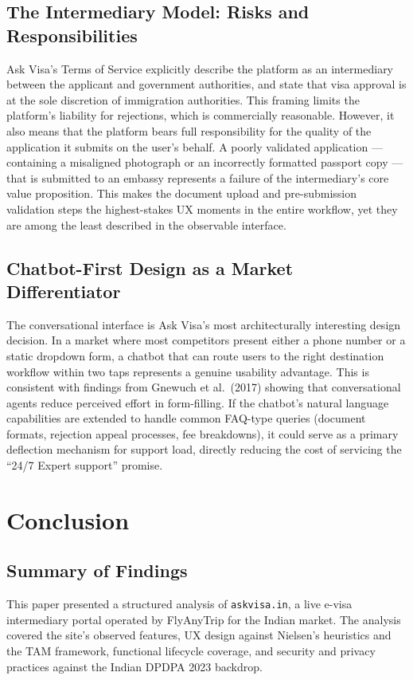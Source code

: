 \documentclass[journal, 10pt, twoside]{IEEEtran}
\begin{document}
\subsection{The Intermediary Model: Risks and Responsibilities}
Ask Visa's Terms of Service explicitly describe the platform as an
intermediary between the applicant and government authorities, and state
that visa approval is at the sole discretion of immigration authorities.
This framing limits the platform's liability for rejections, which is
commercially reasonable. However, it also means that the platform bears
full responsibility for the quality of the application it submits on the
user's behalf. A poorly validated application --- containing a misaligned
photograph or an incorrectly formatted passport copy --- that is submitted
to an embassy represents a failure of the intermediary's core value
proposition. This makes the document upload and pre-submission validation
steps the highest-stakes UX moments in the entire workflow, yet they
are among the least described in the observable interface.

\subsection{Chatbot-First Design as a Market Differentiator}
The conversational interface is Ask Visa's most architecturally interesting
design decision. In a market where most competitors present either a phone
number or a static dropdown form, a chatbot that can route users to the
right destination workflow within two taps represents a genuine usability
advantage. This is consistent with findings from Gnewuch et al.\ (2017)
showing that conversational agents reduce perceived effort in form-filling.
If the chatbot's natural language capabilities are extended to handle common
FAQ-type queries (document formats, rejection appeal processes, fee
breakdowns), it could serve as a primary deflection mechanism for support
load, directly reducing the cost of servicing the ``24/7 Expert support''
promise.

\section{Conclusion}
\label{sec:conclusion}

\subsection{Summary of Findings}
This paper presented a structured analysis of \texttt{askvisa.in}, a live
e-visa intermediary portal operated by FlyAnyTrip for the Indian market.
The analysis covered the site's observed features, UX design against
Nielsen's heuristics and the TAM framework, functional lifecycle coverage,
and security and privacy practices against the Indian DPDPA 2023 backdrop.
\end{document}

